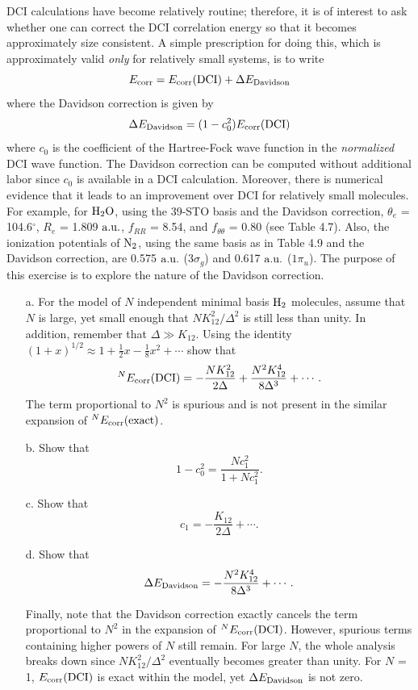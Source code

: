\documentclass[a4paper]{book}
\newcounter{exercise}[chapter]
\newcommand{\corr}{{\rm corr}}
\newcommand{\au}{{\rm a.u.}}
\begin{document}
	\begin{exercise}
	DCI calculations have become relatively routine; therefore, it is of interest to ask whether one can correct the DCI correlation energy so that it becomes approximately size consistent. A simple prescription for doing this, which is approximately valid {\it only} for relatively small systems, is to write
	\[
		E_\corr = E_\corr( {\rm DCI} ) + \Delta E_{\rm Davidson}
	\]
	where the Davidson correction is given by
	\[
		\Delta E_{\rm Davidson} = ( 1 - c^2_0 ) E_\corr( {\rm DCI} )
	\]
	where $c_0$ is the coefficient of the Hartree-Fock wave function in the {\it normalized} DCI wave function. The Davidson correction can be computed without additional labor since $c_0$ is available in a DCI calculation. Moreover, there is numerical evidence that it leads to an improvement over DCI for relatively small molecules. For example, for $\ce{H2O}$, using the 39-STO basis and the Davidson correction, $\theta_e$ = 104.6$^\circ$, $R_e$ = 1.809 $\au$, $f_{RR}$ = 8.54, and $f_{\theta\theta}$ = 0.80 (see Table 4.7). Also, the ionization potentials of $\ce{N2}$, using the same basis as in Table 4.9 and the Davidson correction, are 0.575 $\au$ ($3\sigma_g$) and 0.617 $\au$ ($1\pi_u$). The purpose of this exercise is to explore the nature of the Davidson correction.
	\begin{enumerate}
	
	\item[a.] For the model of $N$ independent minimal basis $\ce{H2}$ molecules, assume that $N$ is large, yet small enough that $NK^2_{12}/\Delta^2$ is still less than unity. In addition, remember that $\Delta \gg K_{12}$. Using the identity $( 1 + x )^{1/2} \approx 1 + \frac{1}{2} x - \frac{1}{8} x^2 + \cdots$ show that
	\[
		{}^N E_\corr( {\rm DCI} ) = - \frac{ N K^2_{12} }{ 2\Delta } + \frac{ N^2 K^4_{12} }{ 8\Delta^3 } + \cdots.
	\]	
	The term proportional to $N^2$ is spurious and is not present in the similar expansion of ${}^N E_\corr( {\rm exact} )$.
	
	\item[b.] Show that
	\[
		1 - c^2_0 = \frac{ N c^2_1 }{ 1 + N c^2_1 }.
	\]
	
	\item[c.] Show that
	\[
		c_1 = - \frac{ K_{12} }{ 2\Delta } + \cdots.
	\]	
	
	\item[d.] Show that
	\[
		\Delta E_{\rm Davidson} = - \frac{ N^2 K^4_{12} }{ 8 \Delta^3 } + \cdots .
	\]

	Finally, note that the Davidson correction exactly cancels the term proportional to $N^2$ in the expansion of ${}^N E_\corr( {\rm DCI} )$. However, spurious terms containing higher powers of $N$ still remain. For large $N$, the whole analysis breaks down since $N K^2_{12} / \Delta^2$ eventually becomes greater than unity. For $N$ = 1, $E_\corr( {\rm DCI} )$ is exact within the model, yet $\Delta E_{\rm Davidson}$ is not zero.
	

\end{enumerate}
\end{exercise}
\end{document}
